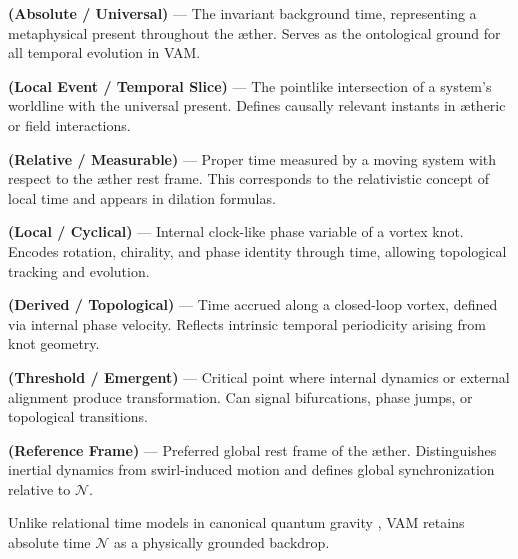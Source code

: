 \documentclass[12pt]{article}
\begin{document}
    \begin{description}[leftmargin=2.5cm, labelwidth=2.2cm, labelsep=0.3cm, style=nextline]

        \item[\textbf{Aithēr-Time} \(\boldsymbol{\mathcal{N}}\)]%
        \textbf{(Absolute / Universal)} — The invariant background time, representing a metaphysical present throughout the æther. Serves as the ontological ground for all temporal evolution in VAM.

        \item[\textbf{Now-Point} \(\boldsymbol{\nu_0}\)]%
        \textbf{(Local Event / Temporal Slice)} — The pointlike intersection of a system’s worldline with the universal present. Defines causally relevant instants in ætheric or field interactions.

        \item[\textbf{Chronos-Time} \(\boldsymbol{\tau}\)]%
        \textbf{(Relative / Measurable)} — Proper time measured by a moving system with respect to the æther rest frame. This corresponds to the relativistic concept of local time and appears in dilation formulas.

        \item[\textbf{Swirl Clock} \( \boldsymbol{S(t)^{\bm{\circlearrowleft} / \bm{\circlearrowright}}}\)]%
        \textbf{(Local / Cyclical)} — Internal clock-like phase variable of a vortex knot. Encodes rotation, chirality, and phase identity through time, allowing topological tracking and evolution.

        \item[\textbf{Vortex Proper Time} \(\boldsymbol{T_v}\)]%
        \textbf{(Derived / Topological)} — Time accrued along a closed-loop vortex, defined via internal phase velocity. Reflects intrinsic temporal periodicity arising from knot geometry.

        \item[\textbf{Kairos Moment} \(\boldsymbol{\mathbb{K}}\)]%
        \textbf{(Threshold / Emergent)} — Critical point where internal dynamics or external alignment produce transformation. Can signal bifurcations, phase jumps, or topological transitions.

        \item[\textbf{Æther Frame} \(\boldsymbol{\Xi_0}\)]%
        \textbf{(Reference Frame)} — Preferred global rest frame of the æther. Distinguishes inertial dynamics from swirl-induced motion and defines global synchronization relative to \(\mathcal{N}\).

    \end{description}


    Unlike relational time models in canonical quantum gravity \cite{rovelli2004quantum}, VAM retains absolute time $\mathcal{N}$ as a physically grounded backdrop.

    
    
\end{document}
